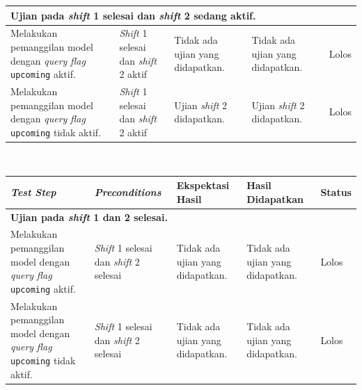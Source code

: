 \begin{enumerate}
\begin{tabularx}{0.9\textwidth}{|X|X|X|X|X|}
            \multicolumn{5}{|p{0.8\textwidth}|}{\textbf{Ujian pada \textit{shift} 1 selesai dan \textit{shift} 2 sedang aktif.}}\\
            \hline
            Melakukan pemanggilan model dengan \textit{query} \textit{flag} \texttt{upcoming} aktif. &
            \textit{Shift} 1 selesai dan \textit{shift} 2 aktif & Tidak ada ujian yang didapatkan. & Tidak ada ujian yang didapatkan. & Lolos \\
            \hline
            Melakukan pemanggilan model dengan \textit{query} \textit{flag} \texttt{upcoming} tidak aktif. &
            \textit{Shift} 1 selesai dan \textit{shift} 2 aktif & Ujian \textit{shift} 2 didapatkan. & Ujian \textit{shift} 2 didapatkan. & Lolos \\
            \hline
        \end{tabularx}\\
        \begin{tabularx}{0.9\textwidth}{|X|X|X|X|X|}
            \hline
            \textit{Test Step} & \textit{Preconditions} & Ekspektasi Hasil & Hasil Didapatkan & Status  \\
            \hline
            \multicolumn{5}{|p{0.8\textwidth}|}{\textbf{Ujian pada \textit{shift} 1 dan 2 selesai.}}\\
            \hline
            Melakukan pemanggilan model dengan \textit{query} \textit{flag} \texttt{upcoming} aktif. &
            \textit{Shift} 1 selesai dan \textit{shift} 2 selesai & Tidak ada ujian yang didapatkan. & Tidak ada ujian yang didapatkan. & Lolos \\
            \hline
            Melakukan pemanggilan model dengan \textit{query} \textit{flag} \texttt{upcoming} tidak aktif. &
            \textit{Shift} 1 selesai dan \textit{shift} 2 selesai & Tidak ada ujian yang didapatkan. & Tidak ada ujian yang didapatkan. & Lolos \\
            \hline
        \end{tabularx}
        
\end{enumerate}


